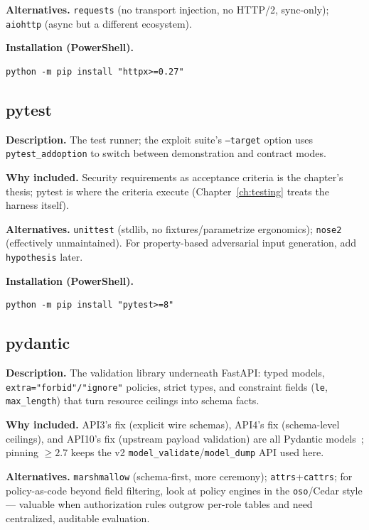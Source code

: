 \textbf{Alternatives.} \texttt{requests} (no transport injection, no
HTTP/2, sync-only); \texttt{aiohttp} (async but a different ecosystem).

\textbf{Installation (PowerShell).}
\begin{verbatim}
python -m pip install "httpx>=0.27"
\end{verbatim}

\subsection{pytest}

\textbf{Description.} The test runner; the exploit suite's
\texttt{--target} option uses \texttt{pytest\_addoption} to switch between
demonstration and contract modes.

\textbf{Why included.} Security requirements as acceptance criteria is the
chapter's thesis; pytest is where the criteria execute
(Chapter~\ref{ch:testing} treats the harness itself).

\textbf{Alternatives.} \texttt{unittest} (stdlib, no fixtures/parametrize
ergonomics); \texttt{nose2} (effectively unmaintained). For property-based
adversarial input generation, add \texttt{hypothesis} later.

\textbf{Installation (PowerShell).}
\begin{verbatim}
python -m pip install "pytest>=8"
\end{verbatim}

\subsection{pydantic}

\textbf{Description.} The validation library underneath FastAPI: typed
models, \texttt{extra="forbid"/"ignore"} policies, strict types, and
constraint fields (\texttt{le}, \texttt{max\_length}) that turn resource
ceilings into schema facts.

\textbf{Why included.} API3's fix (explicit wire schemas), API4's fix
(schema-level ceilings), and API10's fix (upstream payload validation) are
all Pydantic models~\cite{pydanticdocs}; pinning $\ge 2.7$ keeps the v2
\texttt{model\_validate}/\texttt{model\_dump} API used here.

\textbf{Alternatives.} \texttt{marshmallow} (schema-first, more
ceremony); \texttt{attrs}+\texttt{cattrs}; for policy-as-code beyond field
filtering, look at policy engines in the \texttt{oso}/Cedar style ---
valuable when authorization rules outgrow per-role tables and need
centralized, auditable evaluation.


